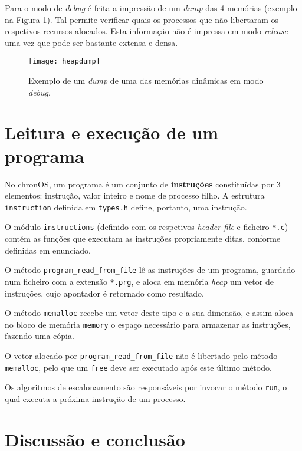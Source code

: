 \documentclass[10pt,oneside]{estiloUBI}
\newcommand{\chronOS}{\textsf{chronOS}}
\begin{document}
	Para o modo de \textit{debug} é feita a impressão de um \textit{dump} das 4 memórias (exemplo na Figura \ref{fig:heapdump}). Tal permite verificar quais os processos que não libertaram os respetivos recursos alocados. Esta informação não é impressa em modo \textit{release} uma vez que pode ser bastante extensa e densa.
	
	\begin{figure}[!htbp]
		\centering
		\texttt{[image: heapdump]}
		\caption{Exemplo de um \textit{dump} de uma das memórias dinâmicas em modo \textit{debug}.}
		\label{fig:heapdump}
	\end{figure}

	
	\chapter{Leitura e execução de um programa}
	\label{sec:program}
	
	No \chronOS, um programa é um conjunto de \textbf{instruções} constituídas por 3 elementos: instrução, valor inteiro e nome de processo filho. A estrutura \verb|instruction| definida em \verb|types.h| define, portanto, uma instrução.
	
	O módulo \texttt{instructions} (definido com os respetivos \textit{header file} e ficheiro \verb|*.c|) contém as funções que executam as instruções propriamente ditas, conforme definidas em enunciado.
	
	O método \verb|program_read_from_file| lê as instruções de um programa, guardado num ficheiro com a extensão \verb|*.prg|, e aloca em memória \textit{heap} um vetor de instruções, cujo apontador é retornado como resultado.
	
	O método \verb|memalloc| recebe um vetor deste tipo e a sua dimensão, e assim aloca no bloco de memória \verb|memory| o espaço necessário para armazenar as instruções, fazendo uma cópia.
	
	O vetor alocado por \verb|program_read_from_file| não é libertado pelo método \verb|memalloc|, pelo que um \verb|free| deve ser executado após este último método.
	
	Os algoritmos de escalonamento são responsáveis por invocar o método \verb|run|, o qual executa a próxima instrução de um processo.
	
	
	\chapter{Discussão e conclusão}
	\label{sec:con_futwork}
	
\end{document}
